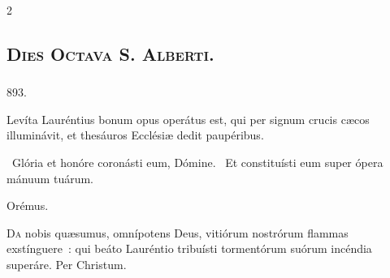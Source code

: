 \documentclass[9pt,twoside]{extarticle}
\begin{document}
\begin{multicols}{2}
%

\subsubsection*{\center {}}
\subsection*{\center \textsc{Dies Octava S. Alberti.}}
\subsubsection*{\center {}}

\begin{tightlist}{}
\item {} 893. 
\item {} Levíta Lauréntius bonum opus operátus est, qui per signum crucis cæcos illuminávit, et thesáuros Ecclésiæ dedit paupéribus.
\item {}~Glória et honóre coronásti eum, Dómine. ~Et constituísti eum super ópera mánuum tuárum.
\item Orémus. \hfill {}
\end{tightlist}
\lettrine{D}a nobis quæsumus, omnípotens Deus, vitiórum nostrórum flammas exstínguere~: qui beáto Lauréntio tribuísti tormentórum suórum incéndia superáre. Per Christum.



\end{multicols}
\end{document}
